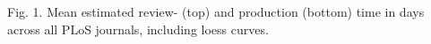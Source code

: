 Fig. 1. Mean estimated review- (top) and production (bottom) time in days across all PLoS journals, including loess curves.